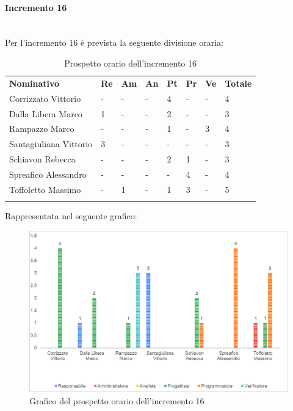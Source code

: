 \paragraph{Incremento 16} \mbox{} \\
Per l'incremento 16 è prevista la seguente divisione oraria:
\begin{longtable} {				
		>{}p{40mm}  
		>{}p{8mm}
		>{}p{8mm}
		>{}p{8mm}
		>{}p{8mm}
		>{}p{8mm}
		>{}p{8mm}
		>{}p{12mm}				
	}			
	\rowcolor{gray!50}
	\textbf{Nominativo} & \textbf{Re} & \textbf{Am} & \textbf{An} & \textbf{Pt} & \textbf{Pr} & \textbf{Ve} & \textbf{Totale}	\TBstrut \\ [2mm]
	Corrizzato Vittorio & - & - & - & 4 & - & - & 4 \TBstrut \\ [2mm]
	Dalla Libera Marco & 1 & - & - & 2 & - & - & 3 \TBstrut \\ [2mm]
	Rampazzo Marco & - & - & - & 1 & - & 3 & 4 \TBstrut \\ [2mm]
	Santagiuliana Vittorio & 3 & - & - & - & - & - & 3 \TBstrut \\ [2mm]
	Schiavon Rebecca & - & - & - & 2 & 1 & - & 3 \TBstrut \\ [2mm]
	Spreafico Alessandro & - & - & - & - & 4 & - & 4 \TBstrut \\ [2mm]
	Toffoletto Massimo & - & 1 & - & 1 & 3 & - & 5 \TBstrut \\ [2mm]
	\rowcolor{white}
	\caption{Prospetto orario dell'incremento 16}
\end{longtable}
Rappresentata nel seguente grafico:
\begin{figure} [H]
	\includegraphics[width=\linewidth]{./img/Grafici/22.png}
	\caption{Grafico del prospetto orario dell'incremento 16}
\end{figure}
